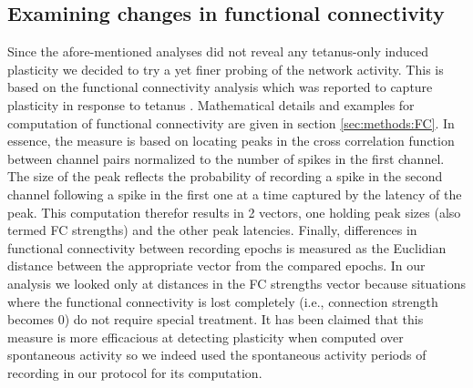         \subsection{Examining changes in functional connectivity}
           Since the afore-mentioned analyses did not reveal any tetanus-only induced plasticity we decided to try a yet finer probing of the network activity. This is based on the functional connectivity analysis which was reported to capture plasticity in response to tetanus \cite{le2015repeated}. Mathematical details and examples for computation of functional connectivity are given in section \ref{sec:methods:FC}. In essence, the measure is based on locating peaks in the cross correlation function between channel pairs normalized to the number of spikes in the first channel. The size of the peak reflects the probability of recording a spike in the second channel following a spike in the first one at a time captured by the latency of the peak. This computation therefor results in 2 vectors, one holding peak sizes (also termed FC strengths) and the other peak latencies. Finally, differences in functional connectivity between recording epochs is measured as the Euclidian distance between the appropriate vector from the compared epochs. In our analysis we looked only at distances in the FC strengths vector because situations where the functional connectivity is lost completely (i.e., connection strength becomes 0) do not require special treatment. It has been claimed that this measure is more efficacious at detecting plasticity when computed over spontaneous activity \cite{le2015repeated} so we indeed used the spontaneous activity periods of recording in our protocol for its computation.

